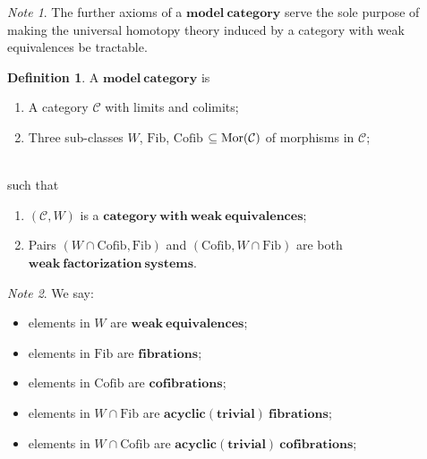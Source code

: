 \documentclass[a4paper]{article}
\theoremstyle{plain}
\theoremstyle{definition}
\newtheorem{defn}{Definition}[section]
\theoremstyle{remark}
\newtheorem*{note}{Note}
\newcommand{\mc}[1]{\mathcal{#1}}
\newcommand{\mbf}[1]{\mathbf{#1}}
\newcommand{\mcC}{\mc C}
\DeclareMathOperator{\Mor}{\rm{Mor}}
\newcommand{\Cofib}{\mathrm{Cofib}}
\newcommand{\Fib}{\mathrm{Fib}}
\begin{document}
    \begin{note}
        The further axioms of a $\mbf{model\ category}$ serve the sole purpose of
        making the universal homotopy theory induced by
        a category with weak equivalences be tractable.

    \end{note}

    \begin{defn}
        A $\mbf{model\ category}$ is
        \begin{enumerate}
            \item A category $\mcC$ with limits and colimits;
            \item Three sub-classes $W$, $\Fib$, $\Cofib$ $ \subseteq \Mor(\mcC)$ of morphisms in $\mcC$;
        \end{enumerate}
        \ \\
        such that
        \begin{enumerate}
            \item $(\mcC, W)$ is a $\mbf{category\ with\ weak\ equivalences}$;
            \item Pairs $(W \cap \Cofib, \Fib)$ and $(\Cofib, W \cap \Fib)$ are both
            $\mbf{weak\ factorization\ systems}$.
        \end{enumerate}

    \end{defn}

    \begin{note}
        We say:
        \begin{itemize}
            \item elements in $W$ are $\mbf{weak\ equivalences}$;
            \item elements in $\Fib$ are $\mbf{fibrations}$;
            \item elements in $\Cofib$ are $\mbf{cofibrations}$;
            \item elements in $W \cap \Fib$ are $\mbf{acyclic(trivial)\ fibrations}$;
            \item elements in $W \cap \Cofib$ are $\mbf{acyclic(trivial)\ cofibrations}$;
        \end{itemize}

    \end{note}
\end{document}
